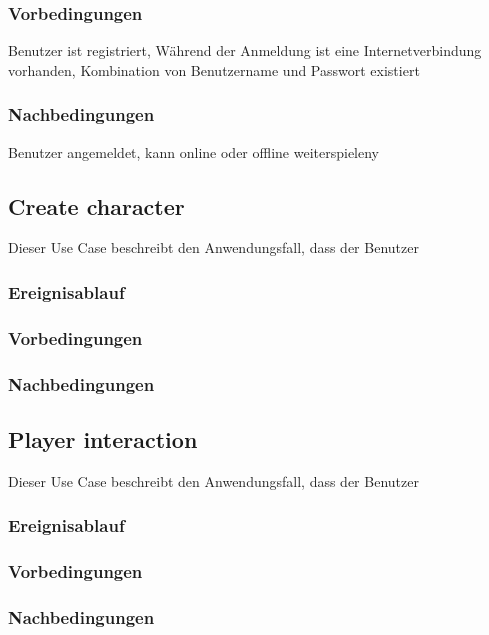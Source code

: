 		\subsubsection{Vorbedingungen}
			Benutzer ist registriert, Während der Anmeldung ist eine Internetverbindung vorhanden, Kombination von Benutzername und Passwort existiert
			
		\subsubsection{Nachbedingungen}
			Benutzer angemeldet, kann online oder offline weiterspieleny
	
	\subsection{Create character}
		Dieser Use Case beschreibt den Anwendungsfall, dass der Benutzer 
			
		\subsubsection{Ereignisablauf}
	
		\subsubsection{Vorbedingungen}
			
		\subsubsection{Nachbedingungen}
	
	\subsection{Player interaction}
		Dieser Use Case beschreibt den Anwendungsfall, dass der Benutzer 
			
		\subsubsection{Ereignisablauf}
			
		\subsubsection{Vorbedingungen}
			
		\subsubsection{Nachbedingungen}
	
